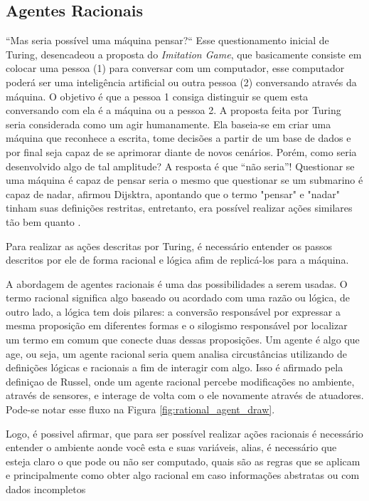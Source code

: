 \subsection{Agentes Racionais}
“Mas seria possível uma máquina pensar?“ Esse questionamento inicial de Turing, desencadeou a proposta do \textit{Imitation Game}, que basicamente consiste em colocar uma pessoa (1) para conversar com um computador, esse computador poderá ser uma inteligência artificial ou outra pessoa (2) conversando através da máquina. O objetivo é que a pessoa 1 consiga distinguir se quem esta conversando com ela é a máquina ou a pessoa 2. A proposta feita por Turing seria considerada como um agir humanamente. Ela baseia-se em criar uma máquina que reconhece a escrita, tome decisões a partir de um base de dados e por final seja capaz de se aprimorar diante de novos cenários. Porém, como seria desenvolvido algo de tal amplitude? A resposta é que “não seria”! Questionar se uma máquina é capaz de pensar seria o mesmo que questionar se um submarino é capaz de nadar, afirmou Dijsktra, apontando que o termo "pensar" e "nadar" tinham suas definições restritas, entretanto, era possível realizar ações similares tão bem quanto \cite[2-3]{dijkstra898, turing1950, russell2003artificial}.

Para realizar as ações descritas por Turing, é necessário entender os passos descritos por ele de forma racional e lógica afim de replicá-los para a máquina.

A abordagem de agentes racionais é uma das possibilidades a serem usadas. O termo racional significa algo baseado ou acordado com uma razão ou lógica, de outro lado, a lógica tem dois pilares: a conversão responsável por expressar a mesma proposição em diferentes formas e o silogismo responsável por localizar um termo em comum que conecte duas dessas proposições. Um agente é algo que age, ou seja, um agente racional seria quem analisa circustâncias utilizando de definições lógicas e racionais a fim de interagir com algo. Isso é afirmado pela definiçao de Russel\cite[7]{russell2003artificial}, onde um agente racional percebe modificações no ambiente, através de sensores, e interage de volta com o ele novamente através de atuadores. Pode-se notar esse fluxo na Figura \ref{fig:rational_agent_draw}.

Logo, é possivel afirmar, que para ser possível realizar ações racionais é necessário entender o ambiente aonde você esta e suas variáveis, alias, é necessário que esteja claro o que pode ou não ser computado, quais são as regras que se aplicam e principalmente como obter algo racional em caso informações abstratas ou com dados incompletos \cite{frege1956thought, wooldridge1994agent, simon1955behavioral, boole1854investigation, russell2003artificial}

